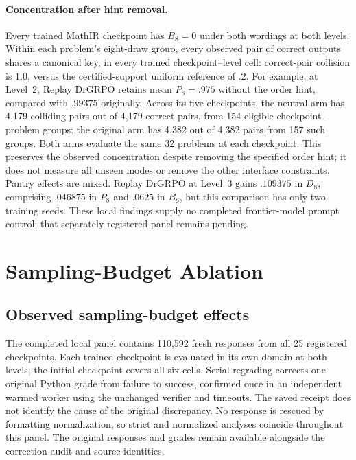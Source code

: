 \documentclass{article}
\newcommand{\1}{\mathbf 1}
\theoremstyle{remark}
\theoremstyle{definition}
\theoremstyle{plain}
\begin{document}
\paragraph{Concentration after hint removal.}
Every trained MathIR checkpoint has $B_8=0$ under both wordings at both levels.
Within each problem's eight-draw group, every observed pair of correct
outputs shares a canonical key, in every trained checkpoint--level cell:
correct-pair collision is $1.0$, versus the
certified-support uniform reference of $.2$. For example, at Level~2, Replay
DrGRPO retains mean $P_8=.975$ without the order hint, compared with $.99375$
originally. Across its five checkpoints, the neutral arm has 4,179 colliding
pairs out of 4,179 correct pairs, from 154 eligible checkpoint--problem
groups; the original arm has 4,382 out of 4,382 pairs from 157 such groups.
Both arms evaluate the same 32 problems at each checkpoint. This preserves
the observed concentration despite removing the specified order hint; it does
not measure all unseen modes or remove the other interface constraints.
Pantry effects are mixed. Replay DrGRPO at Level~3 gains $.109375$ in $D_8$,
comprising $.046875$ in $P_8$ and $.0625$ in $B_8$, but this comparison has only
two training seeds. These local findings supply no completed frontier-model
prompt control; that separately registered panel remains pending.


\clearpage
\section{Sampling-Budget Ablation}
\label{app:sampling-budget-ablation}



\subsection{Observed sampling-budget effects}

The completed local panel contains 110,592 fresh responses from all 25
registered checkpoints. Each trained checkpoint is evaluated in its own domain
at both levels; the initial checkpoint covers all six cells. Serial regrading
corrects one original Python grade from failure to success, confirmed once
in an independent warmed worker using the unchanged verifier and timeouts.
The saved receipt does not identify the cause of the original discrepancy.
No response is rescued by formatting normalization, so strict and normalized
analyses coincide throughout this panel. The original responses and grades
remain available alongside the correction audit and source identities.
\end{document}
